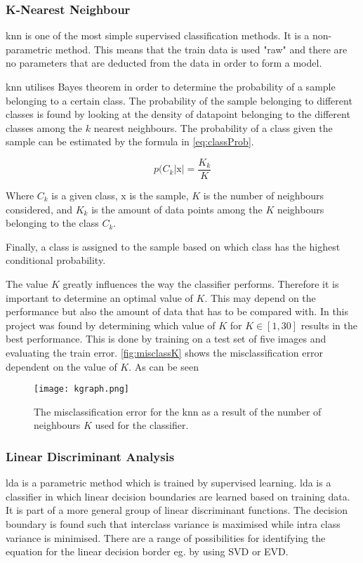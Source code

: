 \subsubsection*{K-Nearest Neighbour}
\gls{knn} is one of the most simple supervised classification methods. It is a non-parametric method. This means that the train data is used "raw" and there are no parameters that are deducted from the data in order to form a model. 
 
\gls{knn} utilises Bayes theorem in order to determine the probability of a sample belonging to a certain class. The probability of the sample belonging to different classes is found by looking at the density of datapoint belonging to the different classes among the $k$ nearest neighbours. The probability of a class given the sample can be estimated by the formula in \autoref{eq:classProb}.

 \begin{equation}\label{eq:classProb}
	p(C_k|\text{x}|=\frac{K_k}{K}
\end{equation}

Where $C_k$ is a given class, $\text{x}$ is the sample, $K$ is the number of neighbours considered, and $K_k$ is the amount of data points among the $K$ neighbours belonging to the class $C_k$.

Finally, a class is assigned to the sample based on which class has the highest conditional probability.

The value $K$ greatly influences the way the classifier performs. Therefore it is important to determine an optimal value of $K$. This may depend on the performance but also the amount of data that has to be compared with. In this project was found by determining which value of $K$ for $K\in[1,30]$ results in the best performance. This is done by training on a test set of five images and evaluating the train error. \autoref{fig:misclassK} shows the misclassification error dependent on the value of $K$. As can be seen 
 \begin{figure}[h]
\centering
\texttt{[image: kgraph.png]}
\caption{The misclassification error for the \gls{knn} as a result of the number of neighbours $K$ used for the classifier.}
\label{fig:misclassK}
\end{figure}
\subsubsection*{Linear Discriminant Analysis}
\gls{lda} is a parametric method which is trained by supervised learning. \gls{lda} is a classifier in which linear decision boundaries are learned based on training data. It is part of a more general group of linear discriminant functions. The decision boundary is found such that interclass variance is maximised while intra class variance is minimised. There are a range of possibilities for identifying the equation for the linear decision border eg. by using SVD or EVD.    

